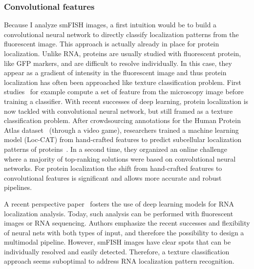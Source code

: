 \subsubsection{Convolutional features}

Because I analyze smFISH images, a first intuition would be to build a convolutional neural network to directly classify localization patterns from the fluorescent image.
This approach is actually already in place for protein localization.
Unlike RNA, proteins are usually studied with fluorescent protein, like \ac{GFP} markers, and are difficult to resolve individually.
In this case, they appear as a gradient of intensity in the fluorescent image and thus protein localization has often been approached like texture classification problem.
First studies~\cite{boland_automated_1998} for example compute a set of feature from the microscopy image before training a classifier.
With recent successes of deep learning, protein localization is now tackled with convolutional neural network, but still framed as a texture classification problem.
After crowdsourcing annotations for the Human Protein Atlas dataset~\cite{Uhlen_2015} (through a video game), researchers trained a machine learning model (Loc-CAT) from hand-crafted features to predict subcellular localization patterns of proteins~\cite{sullivan_deep_2018}.
In a second time, they organized an online challenge~\cite{ouyang_analysis_2019} where a majority of top-ranking solutions were based on convolutional neural networks.
For protein localization the shift from hand-crafted features to convolutional features is significant and allows more accurate and robust pipelines.

A recent perspective paper~\cite{Savulescu_2021} fosters the use of deep learning models for RNA localization analysis.
Today, such analysis can be performed with fluorescent images or RNA sequencing.
Authors emphasize the recent successes and flexibility of neural nets with both types of input, and therefore the possibility to design a multimodal pipeline.
However, smFISH images have clear spots that can be individually resolved and easily detected.
Therefore, a texture classification approach seems suboptimal to address \ac{RNA} localization pattern recognition.


